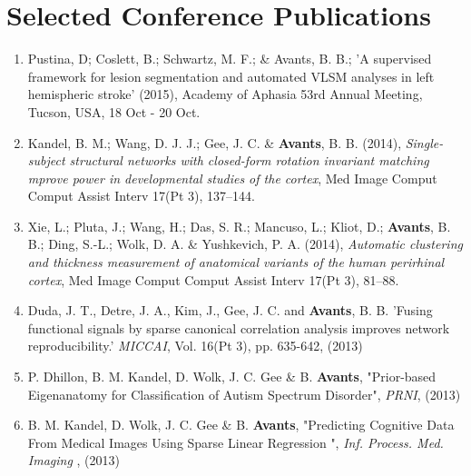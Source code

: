 \documentclass[11pt]{moderncv} %
\begin{document}
\section{Selected Conference Publications}
\begin{enumerate}
\item Pustina, D; Coslett, B.; Schwartz, M. F.; \& Avants, B. B.;
'A supervised framework for lesion segmentation and automated VLSM analyses in left hemispheric stroke' (2015), Academy of Aphasia 53rd Annual Meeting, Tucson, USA, 18 Oct - 20 Oct.

\item Kandel, B. M.; Wang, D. J. J.; Gee, J. C. \& \textbf{Avants}, B. B. (2014), \textit{Single-subject structural networks with closed-form rotation invariant matching mprove power in developmental studies of the cortex}, Med Image Comput Comput Assist Interv 17(Pt 3), 137--144.

\item Xie, L.; Pluta, J.; Wang, H.; Das, S. R.; Mancuso, L.; Kliot, D.; \textbf{Avants}, B. B.; Ding, S.-L.; Wolk, D. A. \& Yushkevich, P. A. (2014), \textit{Automatic clustering and thickness measurement of anatomical variants of the human perirhinal cortex}, Med Image Comput Comput Assist Interv 17(Pt 3), 81--88.

\item Duda, J. T., Detre, J. A., Kim, J., Gee, J. C. and \textbf{Avants}, B. B.
'Fusing functional signals by sparse canonical correlation analysis
improves network reproducibility.'  {\em MICCAI}, Vol. 16(Pt 3), pp. 635-642, (2013)

\item P. Dhillon, B. M. Kandel, D. Wolk, J. C. Gee \&  B. \textbf{Avants},
"Prior-based Eigenanatomy for Classification of Autism Spectrum Disorder",
{\em PRNI}, (2013)

\item B. M. Kandel, D. Wolk, J. C. Gee \&  B. \textbf{Avants},
"Predicting Cognitive Data From Medical Images Using Sparse Linear Regression ",
{\em Inf. Process. Med. Imaging}
, (2013)


\end{enumerate}
\end{document}
